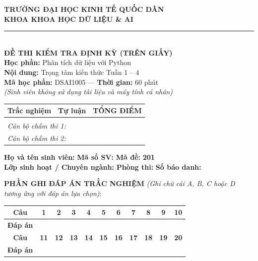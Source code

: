 \documentclass[11pt,a4paper]{article}
\begin{document}
\noindent
\begin{minipage}[t]{0.52\textwidth}
  \centering
  \textbf{TRƯỜNG ĐẠI HỌC KINH TẾ QUỐC DÂN}\\
  \textbf{KHOA KHOA HỌC DỮ LIỆU \& AI}\\
  \rule{4cm}{0.4pt}\\[1.5mm]
  \textbf{ĐỀ THI KIỂM TRA ĐỊNH KỲ (TRÊN GIẤY)}\\
  \textbf{Học phần:} Phân tích dữ liệu với Python\\
  \textbf{Nội dung:} Trọng tâm kiến thức Tuần 1 -- 4\\
  \textbf{Mã học phần:} DSAI1005 --- \textbf{Thời gian:} 60 phút\\
  \textit{\small (Sinh viên không sử dụng tài liệu và máy tính cá nhân)}
\end{minipage}
\hfill
\begin{minipage}[t]{0.45\textwidth}
  \begin{tabular}{|p{2.3cm}|p{2.3cm}|p{2.3cm}|}
    \hline
    \centering \textbf{Trắc nghiệm} & \centering \textbf{Tự luận} & \centering \textbf{TỔNG ĐIỂM} \tabularnewline
    \hline
    & & \\[0.8cm]
    \hline
    \multicolumn{3}{|l|}{\small \textit{Cán bộ chấm thi 1:}} \tabularnewline
    \multicolumn{3}{|l|}{\small \textit{Cán bộ chấm thi 2:}} \tabularnewline
    \hline
  \end{tabular}
\end{minipage}

\vspace{2mm}
\noindent
\textbf{Họ và tên sinh viên:} \dotfill{} \textbf{Mã số SV:} \dotfill{} \textbf{Mã đề:} \textbf{201}\\
\textbf{Lớp sinh hoạt / Chuyên ngành:} \dotfill{} \textbf{Phòng thi:} \dotfill{} \textbf{Số báo danh:} \dotfill

\vspace{2mm}
\noindent
\textbf{PHẦN GHI ĐÁP ÁN TRẮC NGHIỆM} \textit{(Ghi chữ cái A, B, C hoặc D tương ứng với đáp án lựa chọn)}:
\begin{center}
\begin{tabular}{|c|c|c|c|c|c|c|c|c|c|c|}
  \hline
  \textbf{Câu} & \textbf{1} & \textbf{2} & \textbf{3} & \textbf{4} & \textbf{5} & \textbf{6} & \textbf{7} & \textbf{8} & \textbf{9} & \textbf{10} \\
  \hline
  \textbf{Đáp án} & & & & & & & & & & \\[3mm]
  \hline
  \hline
  \textbf{Câu} & \textbf{11} & \textbf{12} & \textbf{13} & \textbf{14} & \textbf{15} & \textbf{16} & \textbf{17} & \textbf{18} & \textbf{19} & \textbf{20} \\
  \hline
  \textbf{Đáp án} & & & & & & & & & & \\[3mm]
  \hline
\end{tabular}
\end{center}
\end{document}
